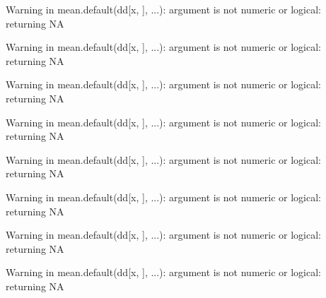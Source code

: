 \begin{Schunk}
\begin{Soutput}
Warning in mean.default(dd[x, ], ...): argument is not numeric or logical: returning NA
\end{Soutput}
\begin{Soutput}
Warning in mean.default(dd[x, ], ...): argument is not numeric or logical: returning NA
\end{Soutput}
\begin{Soutput}
Warning in mean.default(dd[x, ], ...): argument is not numeric or logical: returning NA
\end{Soutput}
\begin{Soutput}
Warning in mean.default(dd[x, ], ...): argument is not numeric or logical: returning NA
\end{Soutput}
\begin{Soutput}
Warning in mean.default(dd[x, ], ...): argument is not numeric or logical: returning NA
\end{Soutput}
\begin{Soutput}
Warning in mean.default(dd[x, ], ...): argument is not numeric or logical: returning NA
\end{Soutput}
\begin{Soutput}
Warning in mean.default(dd[x, ], ...): argument is not numeric or logical: returning NA
\end{Soutput}
\begin{Soutput}
Warning in mean.default(dd[x, ], ...): argument is not numeric or logical: returning NA
\end{Soutput}
\end{Schunk}

